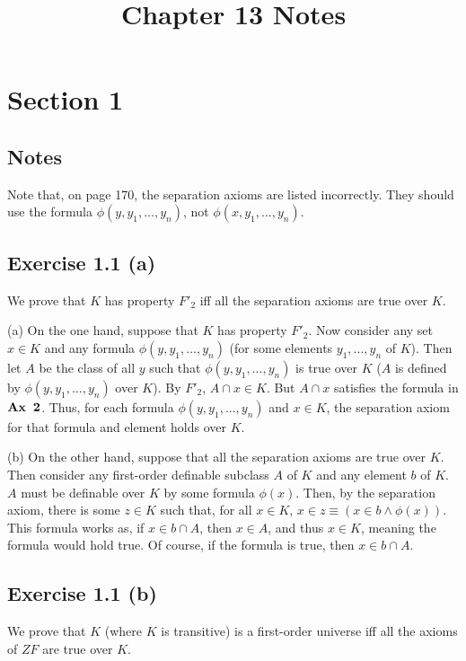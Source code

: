\documentclass{article}
\title{Chapter 13 Notes}
\theoremstyle{definition}
\begin{document}
\date{}
\maketitle

\section*{Section 1}

\subsection*{Notes}
Note that, on page 170, the separation axioms are listed incorrectly. They should use the 
formula $\phi(y,y_1,...,y_n)$, not $\phi(x,y_1,...,y_n)$.

\subsection*{Exercise 1.1 (a)}
We prove that $K$ has property $F'_2$ iff all the separation axioms are true over $K$.

(a) On the one hand, suppose that $K$ has property $F'_2$. Now consider any set $x\in K$ and any 
formula $\phi(y,y_1,...,y_n)$ (for some elements $y_1,...,y_n$ of $K$). Then let $A$ be the class of all $y$ such that 
$\phi(y,y_1,...,y_n)$ is true over $K$ ($A$ is defined by $\phi(y,y_1,...,y_n)$ over $K$). By 
$F'_2$, $A\cap x\in K$. But $A\cap x$ satisfies the formula in $\textbf{Ax\, 2}$. Thus, for each 
formula $\phi(y,y_1,...,y_n)$ and $x\in K$, the separation axiom for that formula and element 
holds over $K$. 

(b) On the other hand, suppose that all the separation axioms are true over $K$. Then consider any 
first-order definable subclass $A$ of $K$ and any element $b$ of $K$. $A$ must be definable over $K$ by 
some formula $\phi(x)$. Then, by the separation axiom, there is some $z\in K$ such that, for all 
$x\in K$, $x\in z\equiv(x\in b\wedge\phi(x))$. This formula works as, if 
$x\in b\cap A$, then $x\in A$, and thus $x\in K$, meaning the formula would hold true. Of course, if 
the formula is true, then $x\in b\cap A$.

\subsection*{Exercise 1.1 (b)}
We prove that $K$ (where $K$ is transitive) is a first-order universe iff all the axioms of $ZF$ are true over $K$.
\end{document}
